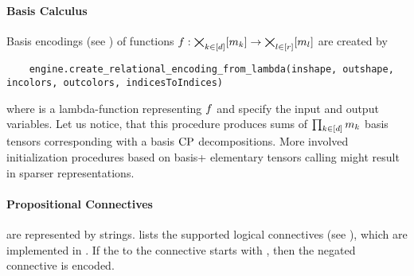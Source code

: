 \paragraph{Basis Calculus}
Basis encodings (see ) of functions $f:\bigtimes_{k\in[d]}[m_{k}] \rightarrow \bigtimes_{l\in[r]}[m_{l}]$ are created by
\begin{lstlisting}
	engine.create_relational_encoding_from_lambda(inshape, outshape, incolors, outcolors, indicesToIndices)
\end{lstlisting}
where  is a lambda-function representing $f$ and  specify the input and output variables.
Let us notice, that this procedure produces sums of $\prod_{k\in[d]}m_{k}$ basis tensors corresponding with a basis $\mathrm{CP}$ decompositions.
More involved initialization procedures based on basis+ elementary tensors calling  might result in sparser representations.

\paragraph{Propositional Connectives} are represented by strings.
 lists the supported logical connectives (see ), which are implemented in .
If the  to the connective starts with , then the negated connective is encoded.

